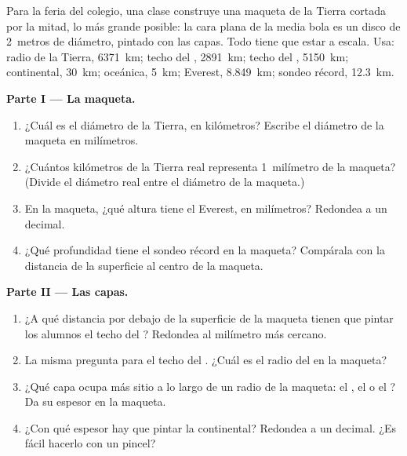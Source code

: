 \begin{problem}
\label{pb:g6:inside-the-earth:1}
Para la feria del colegio, una clase construye una maqueta de la Tierra
cortada por la mitad, lo más grande posible: la cara plana de la media
bola es un disco de 2~metros de diámetro, pintado con las capas. Todo tiene
que estar a escala. Usa: radio de la Tierra, 6371~km; techo del , 2891~km; techo del , 5150~km;  continental,
30~km;  oceánica, 5~km; Everest, 8.849~km; sondeo récord, 12.3~km.

\medskip
\noindent\textbf{Parte I --- La maqueta.}
\begin{enumerate}
  \item ¿Cuál es el diámetro de la Tierra, en kilómetros? Escribe el
        diámetro de la maqueta en milímetros.
  \item ¿Cuántos kilómetros de la Tierra real representa 1~milímetro de la
        maqueta? (Divide el diámetro real entre el diámetro de la maqueta.)
  \item En la maqueta, ¿qué altura tiene el Everest, en milímetros?
        Redondea a un decimal.
  \item ¿Qué profundidad tiene el sondeo récord en la maqueta? Compárala
        con la distancia de la superficie al centro de la maqueta.
\end{enumerate}

\medskip
\noindent\textbf{Parte II --- Las capas.}
\begin{enumerate}[resume]
  \item ¿A qué distancia por debajo de la superficie de la maqueta tienen
        que pintar los alumnos el techo del ? Redondea al
        milímetro más cercano.
  \item La misma pregunta para el techo del . ¿Cuál es el
        radio del  en la maqueta?
  \item ¿Qué capa ocupa más sitio a lo largo de un radio de la maqueta: el
        , el  o el ? Da su espesor en la
        maqueta.
  \item ¿Con qué espesor hay que pintar la  continental? Redondea a
        un decimal. ¿Es fácil hacerlo con un pincel?
\end{enumerate}


\end{problem}
